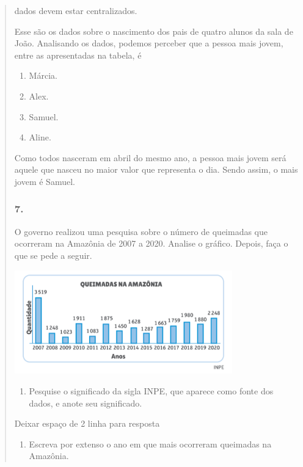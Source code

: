 \begin{enumerate}
\begin{escolha}
\begin{enumerate}
\begin{itemize}
\begin{itemize}
\begin{escolha}
\begin{quote}
\begin{escolha}
{%
dados devem estar centralizados.

Esse são os dados sobre o nascimento dos pais de quatro alunos da sala
de João. Analisando os dados, podemos perceber que a pessoa mais jovem,
entre as apresentadas na tabela, é

\begin{enumerate}
\def\labelenumi{\alph{enumi})}
\item
  Márcia.
\item
  Alex.
\item
  Samuel.
\item
  Aline.
\end{enumerate}

Como todos nasceram em abril do mesmo ano, a pessoa mais jovem será
aquele que nasceu no maior valor que representa o dia. Sendo assim,
o mais jovem é Samuel.

\subsubsection{7.}\label{section-97}

O governo realizou uma pesquisa sobre o número de queimadas que
ocorreram na Amazônia de 2007 a 2020. Analise o gráfico. Depois, faça o que se pede a seguir.


\includegraphics[width=3.71154in,height=1.76937in]{media/image99.png}

\begin{enumerate}
\def\labelenumi{\alph{enumi})}
\item
  Pesquise o significado da sigla INPE, que aparece como fonte dos dados,
  e anote seu significado.
\end{enumerate}

Deixar espaço de 2 linha para resposta

\begin{enumerate}
\def\labelenumi{\alph{enumi})}
\item
  Escreva por extenso o ano em que mais ocorreram queimadas na Amazônia.
\end{enumerate}

}
\end{escolha}
\end{quote}
\end{escolha}
\end{itemize}
\end{itemize}
\end{enumerate}
\end{escolha}
\end{enumerate}
